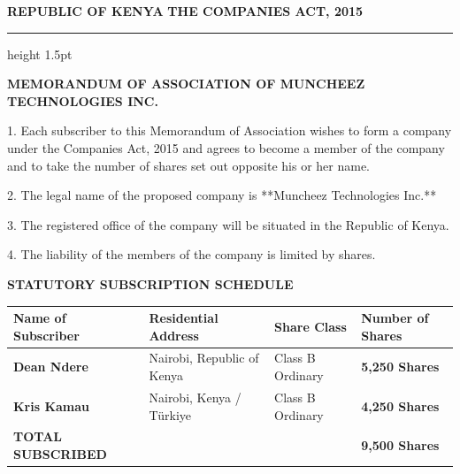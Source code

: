 \documentclass[11pt,a4paper]{article}
\begin{document}
\newpage
\pagestyle{plain}

{\fontsize{18}{22}\sffamily\bfseries\color{CorporateNavy} REPUBLIC OF KENYA} \newline
{\fontsize{14}{18}\sffamily\bfseries\color{LinkBlue} THE COMPANIES ACT, 2015}

\vspace{0.2cm}
\color{RuleNavy}\hrule height 1.5pt
\vspace{0.4cm}

{\fontsize{16}{20}\sffamily\bfseries\color{CorporateNavy} MEMORANDUM OF ASSOCIATION OF MUNCHEEZ TECHNOLOGIES INC.}

\vspace{0.6cm}

1. Each subscriber to this Memorandum of Association wishes to form a company under the Companies Act, 2015 and agrees to become a member of the company and to take the number of shares set out opposite his or her name.

2. The legal name of the proposed company is **Muncheez Technologies Inc.**

3. The registered office of the company will be situated in the Republic of Kenya.

4. The liability of the members of the company is limited by shares.

\vspace{0.8cm}
\textbf{\color{CorporateNavy} STATUTORY SUBSCRIPTION SCHEDULE}

\vspace{0.3cm}
\begin{table}[h!]
\centering
\small
\begin{tabularx}{\textwidth}{@{} p{4.5cm} X p{3cm} >{\raggedleft\arraybackslash}X @{}}
    \toprule
    \textbf{\color{CorporateNavy} Name of Subscriber} & \textbf{\color{CorporateNavy} Residential Address} & \textbf{\color{CorporateNavy} Share Class} & \textbf{\color{CorporateNavy} Number of Shares} \\
    \midrule
    \textbf{Dean Ndere} & Nairobi, Republic of Kenya & Class B Ordinary & \textbf{5,250 Shares} \\
    \textbf{Kris Kamau} & Nairobi, Kenya / Türkiye & Class B Ordinary & \textbf{4,250 Shares} \\
    \midrule
    \textbf{\color{CorporateNavy} TOTAL SUBSCRIBED} & & & \textbf{\color{CorporateNavy} 9,500 Shares} \\
    \bottomrule
\end{tabularx}
\end{table}
\end{document}
